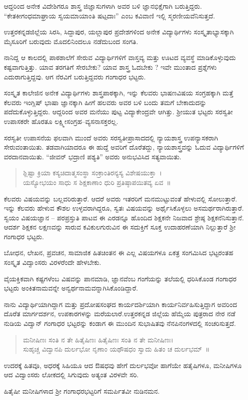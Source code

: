 {ಆದ್ದರಿಂದ ಅನೇಕ ವಿದೇಶಿಗರೂ ಶಾಸ್ತ್ರ ಜಿಜ್ಞಾಸುಗಳಾಗಿ ಅವರ ಬಳಿ ಜ್ಞಾನಭಿಕ್ಷೆಗಾಗಿ ಬರುತ್ತಿದ್ದರು. “ಕೇತಕೀಗಂಧಮಾಘ್ರಾಯ ಸ್ವಯಮಾಯಾಂತಿ ಷಟ್ಪದಾಃ” ಎಂಬ ಕವಿವಾಣಿ ಇಲ್ಲಿ ಸ್ಮರಣೀಯವೆನಿಸುತ್ತದೆ.

ಉತ್ತರಕನ್ನಡಜಿಲ್ಲೆಯ ಸಿರಸಿ, ಸಿದ್ದಾಪುರ, ಯಲ್ಲಾಪುರ ಪ್ರದೇಶಗಳಿಂದ ಅನೇಕ ವಿದ್ಯಾರ್ಥಿಗಳು ಸಂಸ್ಕೃತಾಭ್ಯಾಸಕ್ಕಾಗಿ ಮೈಸೂರಿಗೆ ಬರುವುದು ಮೊದಲಿನಿಂದಲೂ ನಡೆದುಬಂದ ಸಂಗತಿ. 

ನಾನಿದ್ದ ಆ ಕಾಲದಲ್ಲಿ ಪಾಠಶಾಲೆಗೆ ಸೇರುವ ವಿದ್ಯಾರ್ಥಿಗಳಿಗೆ ವಾಸ್ತವ್ಯ ಮತ್ತು ಊಟದ ವ್ಯವಸ್ಥೆ ಮಾಡಿಕೊಳ್ಳುವುದು ಕಷ್ಟವಾಗುತ್ತಿತ್ತು. ಯಾವ ತರಗತಿಗೆ ಸೇರಬೇಕು? ಯಾವ ಶಾಸ್ತ್ರ ಓದಬೇಕು ? ಇವೇ ಮುಂತಾದ ಪ್ರಶ್ನೆಗಳು ಎದುರಾಗುತ್ತಿದ್ದವು. ಆಗ ನೆರವಿಗೆ ಬರುತ್ತಿದ್ದವರು ಗಂಗಾಧರ ಭಟ್ಟರು.

ಸಂಸ್ಕೃತ ಕಾಲೇಜಿನ ಅನೇಕ ವಿದ್ಯಾರ್ಥಿಗಳು ಶಾಸ್ತ್ರಪಾಠಕ್ಕಾಗಿ, ಇನ್ನು ಕೆಲವರು ಭಾಷಣವಿಷಯ ಸಂಗ್ರಹಕ್ಕಾಗಿ ಮತ್ತೆ ಕೆಲವರು ಇಂಗ್ಲಿಷ್ ಭಾಷಾ ಜ್ಞಾನಕ್ಕಾಗಿ ಹೀಗೆ ಹಲವರು ಅವರ ಬಳಿ ಬಂದು ತಮಗೆ ಬೇಕಾದುದನ್ನು ಪದೆದುಕೊಳ್ಳುತ್ತಿದ್ದರು. ಆದ್ದರಿಂದ ಅವರ ಮನೆಯು ಪುಟ್ಟ ವಿದ್ಯಾಕೇಂದ್ರವೇ ಆಗಿತ್ತು. ಶ್ರೀಯುತ ಭಟ್ಟರು ಸರಸ್ವತೀ ಉಪಾಸಕರೇ ಹೊರತೂ ಲಕ್ಷ್ಮೀಸಂಗ್ರಹ–ವ್ಯಸನಾಸಕ್ತರಲ್ಲ.

ಸರಸ್ವತೀ ಉಪಾಸನೆಯ ಫಲವಾಗಿ ಮುಂದೆ ಅವರು ಸರಸ್ವತೀಪ್ರಾಸಾದದಲ್ಲಿ ನ್ಯಾಯಶಾಸ್ತ್ರ ಉಪನ್ಯಾಸಕರಾಗಿ ಸೇರುವಂತಾಯಿತು. ತಡವಾಗಿಯಾದರೂ ಈ ಹುದ್ದೆ ಅವರಿಗೆ ದೊರೆತದ್ದು, ನ್ಯಾಯಶಾಸ್ತ್ರವನ್ನು ಓದುವ ವಿದ್ಯಾರ್ಥಿಗಳಿಗೆ ವರದಾನವಾಯಿತು. “ಜೀವನ್ ಭದ್ರಾಣಿ ಪಶ್ಯತಿ” ಅವರು ಅನುಭವಿಸಿದ ಸತ್ಯವಾಯಿತು.
\begin{verse}
ಶ್ಲಿಷ್ಟಾ ಕ್ರಿಯಾ ಕಸ್ಯಚಿದಾತ್ಮಸಂಸ್ಥಾ ಸಂಕ್ರಾಂತಿರನ್ಯಸ್ಯ ವಿಶೇಷಯುಕ್ತಾ~।\\
ಯಸ್ಯೋಭಯಂ ಸಾಧು ಸ ಶಿಕ್ಷಕಾಣಾಂ ಧುರಿ ಪ್ರತಿಷ್ಠಾಪಯಿತವ್ಯ ಏವ~॥
\end{verse}
ಕೆಲವರು ವಿಷಯವನ್ನು ಬಲ್ಲವರಿರುತ್ತಾರೆ. ಆದರೆ ಅವರು ಇತರರಿಗೆ ಮನಮುಟ್ಟುವಂತೆ ಹೇಳುವಲ್ಲಿ ಸೋಲುತ್ತಾರೆ. ಇನ್ನು ಕೆಲವರು ಹೇಳುವ ಕೌಶಲ ಉಳ್ಳವರಾಗಿದ್ದರೂ, ಸ್ವತಃ ವಿಷಯವನ್ನು ಅರ್ಥೈಸಿಕೊಳ್ಳಲು ಅಸಮರ್ಥರಾಗಿರುತ್ತಾರೆ. ಸ್ವಯಂ ವಿಷಯಜ್ಞಾನ – ಪರಪ್ರಸ್ತುತಿ ಪಾಟವ ಈ ಎರಡನ್ನೂ ಹೊಂದಿದ ಶಿಕ್ಷಕನೇ ನಿಜವಾದ ಶ್ರೇಷ್ಠ ಶಿಕ್ಷಕನೆನಿಸುತ್ತಾನೆ. ಆದರ್ಶ ಶಿಕ್ಷಕನ ಲಕ್ಷಣವನ್ನು ಸಾರುವ ಕವಿಕುಲಗುರುವಿನ ಈ ಸದುಕ್ತಿಗೆ ಸೂಕ್ತ ಉದಾಹರಣೆಯಾಗಿ ನಿಲ್ಲುತ್ತಾರೆ ಶ್ರೀ ಗಂಗಾಧರ ಭಟ್ಟರು.

ಬೋಧನ, ಲೇಖನ, ಪ್ರವಚನ, ಸಾಮಾಜಿಕ ಹಿತಚಿಂತನ ಈ ಎಲ್ಲ ವಿಷಯಗಳೂ ಏಕತ್ರ ಸಂಗಮಿಸಿದ ಭಟ್ಟರಂತಹ ಸಂಸ್ಕೃತ ವಿದ್ವಾಂಸರು ವಿರಳರೆಂದೇ ಹೇಳಬೇಕು. 

ವೈಯಕ್ತಿಕವಾಗಿ ಕಷ್ಟಗಳೆಂಬ ವಿಷವನ್ನು ಪಾನಮಾಡಿ, ಜ್ಞಾನವೆಂಬ ಗಂಗೆಯನ್ನು ತಲೆಯಲ್ಲಿ ಧರಿಸಿಕೊಂಡ ಗಂಗಾಧರ ಭಟ್ಟರು ಅಂಕಿತನಾಮವನ್ನೇ ಅನ್ವರ್ಥನಾಮವನ್ನಾಗಿಸಿಕೊಂಡಿದ್ದಾರೆ.

ನಾನು ವಿದ್ಯಾರ್ಥಿಯಾಗಿದ್ದಾಗ ಮತ್ತು ಪ್ರದೋಷಸಂಘದ ಕಾರ್ಯದರ್ಶಿಯಾಗಿ ಕಾರ್ಯನಿರ್ವಹಿಸುತ್ತಿದ್ದಾಗ ಅವರಿಂದ ದೊರೆತ ಮಾರ್ಗದರ್ಶನ, ಉಪಕಾರಗಳನ್ನು ಮರೆಯಲಾರೆ.ಉತ್ತರಕನ್ನಡ ಜಿಲ್ಲೆಯ ಹೆಮ್ಮೆಯ ಪುತ್ರರಾದ ನೇರ ನಡೆ ನುಡಿಯ ವಿದ್ವಾನ್ ಗಂಗಾಧರ ಭಟ್ಟರನ್ನು ಕಂಡಾಗ ಈ ಮುಂದಿನ ಸುಭಾಷಿತವು ನೆನಪಿನಂಗಳದಲ್ಲಿ ಸಂಚರಿಸುತ್ತದೆ.
\begin{verse}
ಮನೀಷಿಣಃ ಸಂತಿ ನ ತೇ ಹಿತೈಷಿಣಃ ಹಿತೈಷಿಣಃ ಸಂತಿ ನ ತೇ ಮನೀಷಿಣಃ।\\
ಸುಹೃಚ್ಚ ವಿದ್ವಾನಪಿ ದುರ್ಲಭೋ ನೃಣಾಂ ಯಥೌಷಧಂ ಸ್ವಾದು ಹಿತಂ ಚ ದುರ್ಲಭಮ್~॥
\end{verse}
ಉದರಕ್ಕೆ ಹಿತವೂ, ಅಧರಕ್ಕೆ ಸಿಹಿಯೂ ಆದ ಔಷಧವು ಹೇಗೆ ದುರ್ಲಭವೋ ಹಾಗೆಯೇ ಹತೈಷಿಗಳೂ, ಮನೀಷಿಗಳೂ ಆದ ವಿದ್ವಾಂಸರು ಲೋಕದಲ್ಲಿ ಸಿಗುವುದು ಅತ್ಯಂತ ವಿರಳವೇ ಸರಿ. 

ಹಿತೈಷೀ ಮನೀಷಿಗಳಾದ ಶ್ರೀ ಗಂಗಾಧರಭಟ್ಟರಿಗೆ ಸಮರ್ಪಿತವೀ ನುಡಿನಮನ.

\articleend
}
